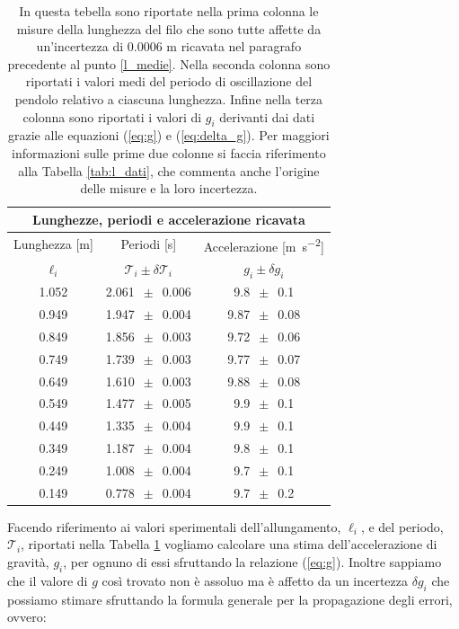 \begin{table}
    \centering
    \begin{tabular}{c c c}
        \multicolumn{3}{c}{\textbf{Lunghezze, periodi e accelerazione ricavata}} \\
        \toprule
        Lunghezza [\si{\metre}] & Periodi [\si{\second}] & Accelerazione [\si{\metre\per\square\second}] \\ %
        $\ell_i$ & $\mathcal{T}_i \pm \delta\mathcal{T}_i$ & $g_i \pm \delta g_i$ \\
        \midrule
			1.052 & 2.061 $\,\pm\,$ 0.006 & 9.8 $\,\pm\,$ 0.1 \\
			0.949 & 1.947 $\,\pm\,$ 0.004 & 9.87 $\,\pm\,$ 0.08 \\
			0.849 & 1.856 $\,\pm\,$ 0.003 & 9.72 $\,\pm\,$ 0.06 \\
			0.749 & 1.739 $\,\pm\,$ 0.003 & 9.77 $\,\pm\,$ 0.07 \\
			0.649 & 1.610 $\,\pm\,$ 0.003 & 9.88 $\,\pm\,$ 0.08 \\
			0.549 & 1.477 $\,\pm\,$ 0.005 & 9.9 $\,\pm\,$ 0.1 \\
			0.449 & 1.335 $\,\pm\,$ 0.004 & 9.9 $\,\pm\,$ 0.1 \\
			0.349 & 1.187 $\,\pm\,$ 0.004 & 9.8 $\,\pm\,$ 0.1 \\
			0.249 & 1.008 $\,\pm\,$ 0.004 & 9.7 $\,\pm\,$ 0.1 \\
			0.149 & 0.778 $\,\pm\,$ 0.004 & 9.7 $\,\pm\,$ 0.2 \\
		\bottomrule
    \end{tabular}
    \caption{In questa tebella sono riportate nella prima colonna le misure della lunghezza del filo che sono tutte affette da un'incertezza di 0.0006 m ricavata nel paragrafo precedente al punto \ref{l_medie}. Nella seconda colonna sono riportati i valori medi del periodo di oscillazione del pendolo relativo a ciascuna lunghezza. Infine nella terza colonna sono riportati i valori di $g_i$ derivanti dai dati grazie alle equazioni (\ref{eq:g}) e (\ref{eq:delta_g}). Per maggiori informazioni sulle prime due colonne si faccia riferimento alla Tabella \ref{tab:l_dati}, che commenta anche l'origine delle misure e la loro incertezza.}
    \label{tab:calcolo_g}
\end{table}

Facendo riferimento ai valori sperimentali dell'allungamento, $\ell_i$, e del periodo, $\mathcal{T}_i$, riportati nella Tabella \ref{tab:calcolo_g} vogliamo calcolare una stima dell'accelerazione di gravità, $g_i$, per ognuno di essi sfruttando la relazione (\ref{eq:g}). Inoltre sappiamo che il valore di $g$ così trovato non è assoluo ma è affetto da un incertezza $\delta g_i$ che possiamo stimare sfruttando la formula generale per la propagazione degli errori, ovvero:

